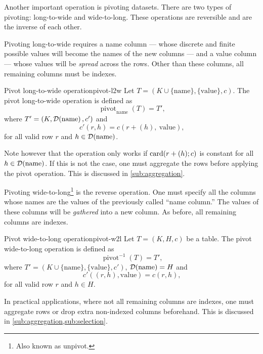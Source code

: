 Another important operation is pivoting datasets.  There are two types of pivoting:
long-to-wide and wide-to-long.  These operations are reversible and are the inverse
of each other.

Pivoting long-to-wide requires a name column --- whose discrete and finite
possible values will become the names of the new columns --- and a value column --- whose
values will be \emph{spread} across the rows.  Other than these columns, all remaining columns
must be indexes.

\begin{defbox}{Pivot long-to-wide operation}{pivot-l2w}
  Let $T = (K \cup \{\text{name}\}, \{\text{value}\}, c)$. The pivot long-to-wide
  operation is defined as \[
    \operatorname{pivot}_\text{name}(T) = T'\text{,}
  \] where $T' = (K, \domainof{\text{name}}, c')$ and \[
    c'(r, h) = c\left(r + (h),~\text{value}\right)\text{,}
  \]
  for all valid row $r$ and $h \in \domainof{\text{name}}$.
\end{defbox}

Note however that the operation only works if $\rowcard[r + (h); c]$ is constant for all
$h \in \domainof{\text{name}}$.  If this is not the case, one must aggregate the rows
before applying the pivot operation.  This is discussed in \cref{sub:aggregation}.

Pivoting wide-to-long\footnote{Also known as unpivot.} is the reverse operation. One must
specify all the columns whose names are the values of the previously called ``name column.''
The values of these columns will be \emph{gathered} into a new column. As before, all
remaining columns are indexes.

\begin{defbox}{Pivot wide-to-long operation}{pivot-w2l}
  Let $T = (K, H, c)$ be a table.  The pivot wide-to-long
  operation is defined as \[
    \operatorname{pivot}^{-1}(T) = T'\text{,}
  \] where $T' = (K \cup \{\text{name}\}, \{\text{value}\}, c')$, $\domainof{\text{name}}
  = H$ and \[
    c'((r, h), \text{value}) = c(r, h)\text{,}
  \] for all valid row $r$ and $h \in H$.
\end{defbox}

In practical applications, where not all remaining columns are indexes, one must aggregate
rows or drop extra non-indexed columns beforehand.  This is discussed in
\cref{sub:aggregation,sub:selection}.

